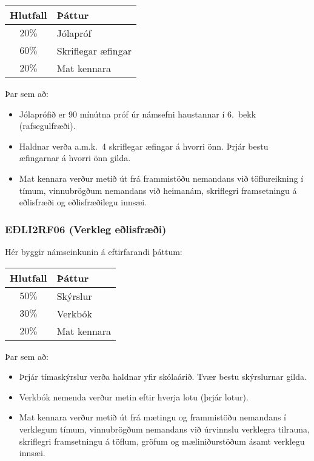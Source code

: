 \begin{table}[H]
    \centering
    \begin{tabular}{|c|l|}
    \hline
        Hlutfall & \hspace{0.75cm}Þáttur \\ \hline \hline
        $20 \%$ & Jólapróf \\ \hline
        $60 \%$ & Skriflegar æfingar \\ \hline
        $20 \%$ & Mat kennara\\ \hline
    \end{tabular}
\end{table}

Þar sem að:

\begin{itemize}
    \item Jólaprófið er 90 mínútna próf úr námsefni haustannar í 6.~bekk (rafsegulfræði).
    
    \item Haldnar verða a.m.k.~4 skriflegar æfingar á hvorri önn. Þrjár bestu æfingarnar á hvorri önn gilda.
    
    \item Mat kennara verður metið út frá frammistöðu nemandans við töflureikning í tímum, vinnubrögðum nemandans við heimanám, skriflegri framsetningu á eðlisfræði og eðlisfræðilegu innsæi.
\end{itemize}

\subsubsection*{EÐLI2RF06 (Verkleg eðlisfræði)}

Hér byggir námseinkunin á eftirfarandi þáttum:

\begin{table}[H]
    \centering
    \begin{tabular}{|c|l|}
    \hline
        Hlutfall & \hspace{0.5cm}Þáttur \\ \hline \hline
        $50\%$ & Skýrslur \\ \hline
        $30\%$ & Verkbók \\ \hline
        $20\%$ & Mat kennara \\ \hline
    \end{tabular}
\end{table}

Þar sem að:

\begin{itemize}
    \item Þrjár tímaskýrslur verða haldnar yfir skólaárið. Tvær bestu skýrslurnar gilda.
    
    \item Verkbók nemenda verður metin eftir hverja lotu (þrjár lotur).
    
    \item Mat kennara verður metið út frá mætingu og frammistöðu nemandans í verklegum tímum, vinnubrögðum nemandans við úrvinnslu verklegra tilrauna, skriflegri framsetningu á töflum, gröfum og mæliniðurstöðum ásamt verklegu innsæi.
\end{itemize}


